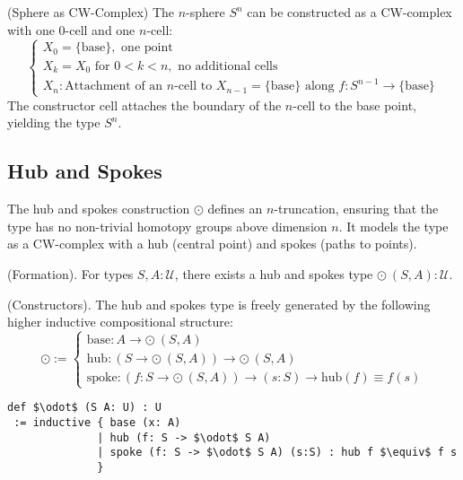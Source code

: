 \begin{example} (Sphere as CW-Complex)
The \( n \)-sphere \( S^n \) can be constructed as a CW-complex with
one 0-cell and one \( n \)-cell:
\[
\begin{cases}
X_0 = \{ \text{base} \}, \text{ one point} \\
X_k = X_0 \text{ for } 0 < k < n, \text{ no additional cells} \\
X_n: \text{Attachment of an } n\text{-cell to } X_{n-1} = \{ \text{base} \} \text{ along } f : S^{n-1} \to \{ \text{base} \}
\end{cases}
\]
The constructor \( \text{cell} \) attaches the boundary of the \( n \)-cell
to the base point, yielding the type \( S^n \).
\end{example}

\newpage
\subsection{Hub and Spokes}
The hub and spokes construction \( \odot \) defines an \( n \)-truncation,
ensuring that the type has no non-trivial homotopy groups above
dimension \( n \). It models the type as a CW-complex with
a hub (central point) and spokes (paths to points).

\begin{definition} (Formation).
For types \( S, A : \mathcal{U} \), there exists a hub and spokes type \( \odot\ (S,A) : \mathcal{U} \).
\end{definition}

\begin{definition} (Constructors).
The hub and spokes type is freely generated by the following higher inductive compositional structure:
\[
\odot :=
\begin{cases}
\text{base} : A \to \odot\ (S,A) \\
\text{hub} : (S \to \odot\ (S,A)) \to \odot\ (S,A) \\
\text{spoke} : (f : S \to \odot\ (S,A)) \to (s : S) \to \text{hub}(f) \equiv f(s)
\end{cases}
\]
\begin{lstlisting}[mathescape=true]
def $\odot$ (S A: U) : U
 := inductive { base (x: A)
              | hub (f: S -> $\odot$ S A)
              | spoke (f: S -> $\odot$ S A) (s:S) : hub f $\equiv$ f s
              }
\end{lstlisting}
\end{definition}

